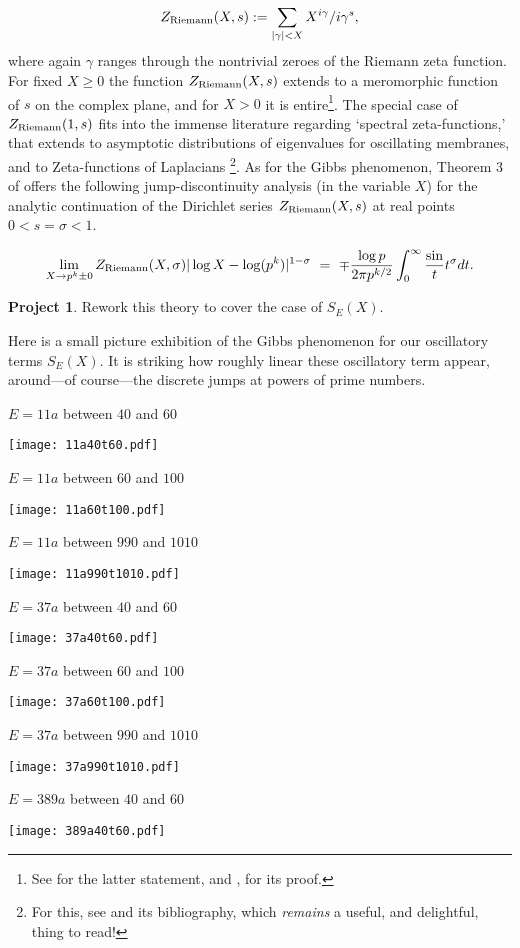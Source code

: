 \documentclass[11pt]{article}
\theoremstyle{plain}
\theoremstyle{definition}
\newtheorem{project}[theorem]{Project}
\numberwithin{equation}{section}
\numberwithin{figure}{section}
\numberwithin{table}{section}
\begin{document}
 $$Z_{\rm Riemann}(X,s): =   \sum_{|\gamma|<X}X^{i\gamma}/i\gamma^s,$$ where again $\gamma$ ranges through the nontrivial zeroes of the Riemann zeta function.  For fixed $X\ge 0$ the function $Z_{\rm Riemann}(X,s)$ extends to a meromorphic function of $s$ on the  complex plane, and for $X>0$ it is entire{\footnote{ See \cite{Fu3} for the latter statement, and \cite{Fu1}, \cite{Fu2} for its proof.\vskip10pt}}.  The special case of $Z_{\rm Riemann}(1,s)$  fits into the immense literature regarding `spectral zeta-functions,' that extends to asymptotic
distributions of eigenvalues for oscillating membranes, and  to Zeta-functions of Laplacians {\footnote{ For this, see \cite{W} and its bibliography, which {\it remains} a useful, and delightful,   thing to read!}}. As for the Gibbs phenomenon, Theorem 3 of \cite{Fu3} offers the following jump-discontinuity analysis (in the variable $X$) for the analytic continuation of the Dirichlet series $Z_{\rm Riemann}(X,s)$ at real points $0 < s = \sigma < 1$.

 $$\lim_{X \to p^k\pm 0}{{Z_{\rm Riemann}(X,\sigma)}{|\log X -\log(p^k)|^{1-\sigma}} \ = \ \mp {\frac{\log p}{2\pi p^{k/2}}}\int_0^{\infty}{\frac \sin t}{t^{\sigma}}}dt.$$
 \vskip10pt
 \begin{project} Rework this theory to cover the case of $S_E(X)$.\end{project}
  \vskip10pt
  Here is a small picture exhibition of the Gibbs phenomenon for our oscillatory terms $S_E(X)$.  It is striking how roughly linear these oscillatory term appear, around---of course---the discrete jumps at powers of prime numbers.
 \vskip10pt

 \centerline{ $E = 11a$  between $40$ and $60$}
   \vskip10pt
 \hskip100pt \texttt{[image: 11a40t60.pdf]}
    \newpage
  \centerline{ $E = 11a$  between $60$ and $100$}
   \vskip10pt
 \hskip100pt \texttt{[image: 11a60t100.pdf]}

   \vskip10pt
   \centerline{ $E = 11a$  between $990$ and $1010$}
   \vskip10pt
 \hskip100pt \texttt{[image: 11a990t1010.pdf]}

 \newpage
   \centerline{ $E = 37a$  between $40$ and $60$}

   \vskip10pt
 \hskip100pt \texttt{[image: 37a40t60.pdf]}

   \centerline{ $E = 37a$  between $60$ and $100$}
   \vskip10pt
 \hskip100pt \texttt{[image: 37a60t100.pdf]}
 \newpage
  \centerline{ $E = 37a$  between $990$ and $1010$}
   \vskip10pt
 \hskip100pt \texttt{[image: 37a990t1010.pdf]}
 \newpage
  \centerline{ $E = 389a$  between $40$ and $60$}
   \vskip10pt
 \hskip100pt \texttt{[image: 389a40t60.pdf]}
\end{document}
